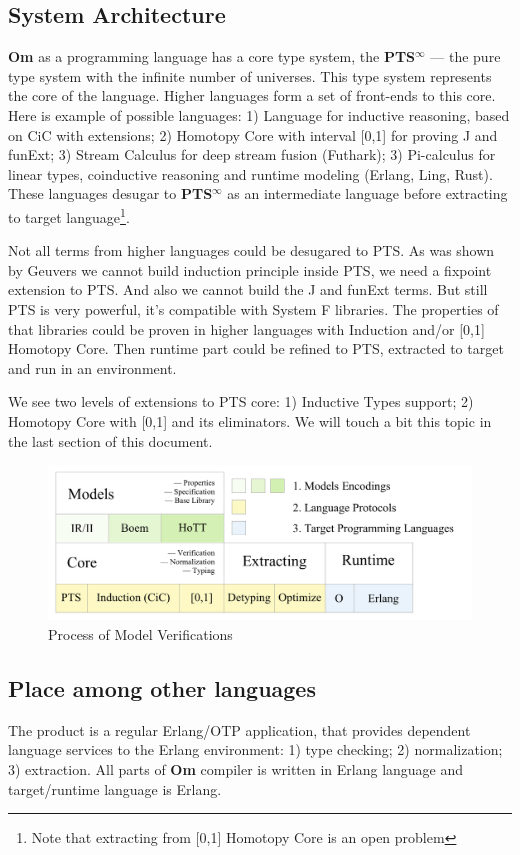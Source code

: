 \documentclass{aip-cp}
\begin{document}
\subsection{System Architecture}
{\bf Om} as a programming language has a core type system, the {\bf PTS$^{\infty}$} --- the pure type system with the infinite number of universes.
This type system represents the core of the language.
Higher languages form a set of front-ends to this core.
 Here is example of possible languages:
1) Language for inductive reasoning, based on CiC with extensions;
2) Homotopy Core with interval [0,1] for proving J and funExt;
3) Stream Calculus for deep stream fusion (Futhark);
3) Pi-calculus for linear types, coinductive reasoning and runtime modeling (Erlang, Ling, Rust).
These languages desugar to {\bf PTS$^{\infty}$} as an intermediate language before extracting to target language\footnote{Note that extracting from [0,1] Homotopy Core is an open problem}.

Not all terms from higher languages could be desugared to PTS.
As was shown by Geuvers\cite{Geuvers01} we cannot build induction principle inside PTS, we need a fixpoint extension to PTS.
And also we cannot build the J and funExt terms.
But still PTS is very powerful, it's compatible with System F libraries.
The properties of that libraries could be proven in higher languages with Induction and/or [0,1] Homotopy Core.
Then runtime part could be refined to PTS, extracted to target and run in an environment.

We see two levels of extensions to PTS core: 1) Inductive Types support; 2) Homotopy Core with [0,1] and its eliminators.
We will touch a bit this topic in the last section of this document.

\begin{figure}[h]
  \centerline{\includegraphics[scale=0.28]{static}}
  \caption{Process of Model Verifications}
\end{figure}

\subsection{Place among other languages}
The product is a regular Erlang/OTP application, that provides dependent language services to the Erlang environment: 1) type checking; 2) normalization; 3) extraction.
All parts of {\bf Om} compiler is written in Erlang language and target/runtime language is Erlang.
\end{document}
